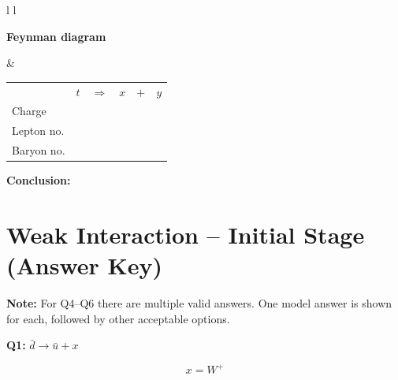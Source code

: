 \documentclass[12pt]{article}
\begin{document}
\begin{tabular}{l l}

\begin{minipage}[t]{0.46\textwidth}
\vspace{0pt}
\textbf{Feynman diagram}

\vspace{0.6cm}

\begin{tikzpicture}
  \path (0,0) rectangle (6,4.5);
\end{tikzpicture}


\end{minipage}
&
\begin{minipage}[t]{0.50\textwidth}
\vspace{0pt}

\renewcommand{\arraystretch}{1.4}
\begin{tabular}{@{}l c c c c c@{}}
 & \(t\) & \(\Rightarrow\) & \(x\) & \(+\) & \(y\) \\
Charge &  &  &  &  &  \\
Lepton no. &  &  &  &  &  \\
Baryon no. &  &  &  &  &  \\
\end{tabular}

\end{minipage}

\end{tabular}

\vspace{0.5cm}

\textbf{Conclusion:}

\vspace{2.2cm}

\newpage

\section*{Weak Interaction -- Initial Stage \; (Answer Key)}

\textbf{Note:} For Q4--Q6 there are multiple valid answers. One model answer is shown for each, followed by other acceptable options.

\vspace{0.7cm}

\textbf{Q1:} \(\bar{d} \rightarrow \bar{u} + x\)

\[
\boxed{x = W^+}
\]
\end{document}
